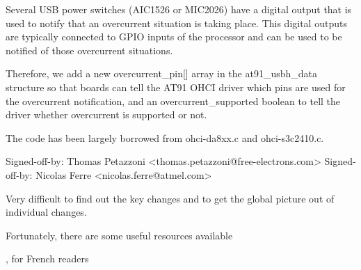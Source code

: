     Several USB power switches (AIC1526 or MIC2026) have a digital output
    that is used to notify that an overcurrent situation is taking
    place. This digital outputs are typically connected to GPIO inputs of
    the processor and can be used to be notified of those overcurrent
    situations.

    Therefore, we add a new overcurrent_pin[] array in the at91_usbh_data
    structure so that boards can tell the AT91 OHCI driver which pins are
    used for the overcurrent notification, and an overcurrent_supported
    boolean to tell the driver whether overcurrent is supported or not.

    The code has been largely borrowed from ohci-da8xx.c and
    ohci-s3c2410.c.

    Signed-off-by: Thomas Petazzoni <thomas.petazzoni@free-electrons.com>
    Signed-off-by: Nicolas Ferre <nicolas.ferre@atmel.com>
\stoptyping
    \startitemize
    \item Very difficult to find out the key changes and to get the
      global picture out of individual changes.
    \stopitemize
  \item Fortunately, there are some useful resources available
    \startitemize
    \item {}
    \item {}
    \item {}, for French readers
    \stopitemize
  \stopitemize
